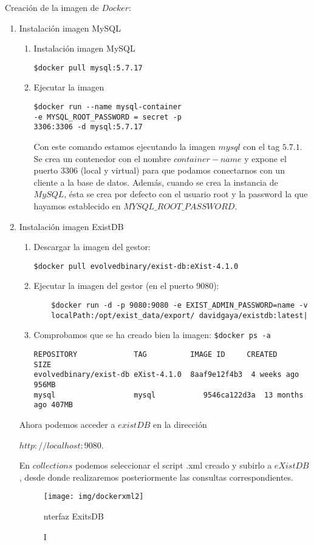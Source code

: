 \documentclass[12pt,a4paper]{article}
\begin{document}
Creación de la imagen de $Docker:$
\begin{enumerate}
\item Instalación imagen MySQL
\begin{enumerate}[label*=\arabic*.]
\item Instalación imagen  MySQL

\verb|$docker pull mysql:5.7.17|

\item Ejecutar la imagen 
\begin{verbatim}
$docker run --name mysql-container 
-e MYSQL_ROOT_PASSWORD = secret -p 
3306:3306 -d mysql:5.7.17
\end{verbatim}
Con este comando estamos ejecutando la imagen $mysql$ con el tag $5.7.1$. Se crea un contenedor con el nombre $container-name$ y expone el puerto $3306$ (local y virtual) para que podamos conectarnos con un cliente a la base de datos. Además, cuando se crea la instancia de $MySQL$, ésta se crea por defecto con el usuario root y la password la que hayamos establecido en $MYSQL\_ROOT\_PASSWORD.$ 

\end{enumerate}
\item Instalación imagen  ExistDB
\begin{enumerate}[label*=\arabic*.]
\item Descargar la imagen del gestor:

	\verb|$docker pull evolvedbinary/exist-db:eXist-4.1.0|
\item Ejecutar la imagen del gestor (en el puerto 9080):
	\begin{verbatim}
	$docker run -d -p 9080:9080 -e EXIST_ADMIN_PASSWORD=name -v 
	localPath:/opt/exist_data/export/ davidgaya/existdb:latest|
	\end{verbatim}

\item Comprobamos que se ha creado bien la imagen:
	\verb|$docker ps -a|
	\begin{verbatim}
REPOSITORY             TAG          IMAGE ID     CREATED    SIZE
evolvedbinary/exist-db eXist-4.1.0  8aaf9e12f4b3  4 weeks ago 956MB
mysql                  mysql	       9546ca122d3a  13 months ago 407MB
	\end{verbatim}
\end{enumerate}

Ahora podemos acceder a $existDB$ en la dirección
  
$http://localhost:9080$.

En $collections$ podemos seleccionar el script .xml creado y subirlo a $eXistDB$, desde donde realizaremos posteriormente las consultas correspondientes. 


\begin{figure}[!h]
\centering 
\texttt{[image: img/dockerxml2]}
\caption Interfaz ExitsDB
\label{interfazxdb}
\end{figure}
\end{enumerate}
\end{document}
